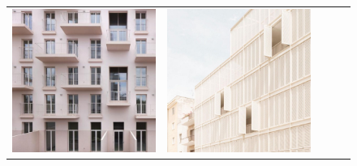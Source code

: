 \begin{figure}[H]
{\begin{tabular}{@{}ccccc@{}}
      \includegraphics[width=\linewidth]{Images/LoRAs/3D-effect/Training_images/13.jpg} &
      \includegraphics[width=\linewidth]{Images/LoRAs/3D-effect/Training_images/14.jpg} &

\end{tabular}}
\end{figure}
